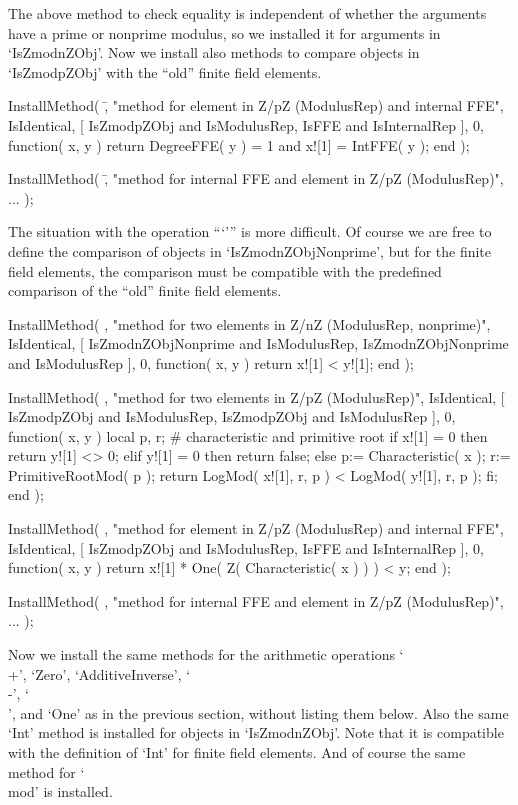 The above method to check equality is independent of whether the
arguments have a prime or nonprime modulus,
so we installed it for arguments in `IsZmodnZObj'.
Now we install also methods to compare objects in `IsZmodpZObj'
with the ``old'' finite field elements.

\beginexample
    InstallMethod( \=,
        "method for element in Z/pZ (ModulusRep) and internal FFE",
        IsIdentical,
        [ IsZmodpZObj and IsModulusRep, IsFFE and IsInternalRep ], 0,
        function( x, y )
        return DegreeFFE( y ) = 1 and x![1] = IntFFE( y );
        end );

    InstallMethod( \=,
        "method for internal FFE and element in Z/pZ (ModulusRep)",
        ... );
\endexample

The situation with the operation ```\<''' is more difficult.
Of course we are free to define the comparison of objects in
`IsZmodnZObjNonprime',
but for the finite field elements, the comparison must be compatible
with the predefined comparison of the ``old'' finite field elements.

\beginexample
    InstallMethod( \<,
        "method for two elements in Z/nZ (ModulusRep, nonprime)",
        IsIdentical,
        [ IsZmodnZObjNonprime and IsModulusRep,
          IsZmodnZObjNonprime and IsModulusRep ], 0,
        function( x, y ) return x![1] < y![1]; end );

    InstallMethod( \<,
        "method for two elements in Z/pZ (ModulusRep)",
        IsIdentical,
        [ IsZmodpZObj and IsModulusRep,
          IsZmodpZObj and IsModulusRep ], 0,
        function( x, y )
        local p, r;      # characteristic and primitive root
        if x![1] = 0 then
          return y![1] <> 0;
        elif y![1] = 0 then
          return false;
        else
          p:= Characteristic( x );
          r:= PrimitiveRootMod( p );
          return LogMod( x![1], r, p ) < LogMod( y![1], r, p );
        fi;
        end );

    InstallMethod( \<,
        "method for element in Z/pZ (ModulusRep) and internal FFE",
        IsIdentical,
        [ IsZmodpZObj and IsModulusRep, IsFFE and IsInternalRep ], 0,
        function( x, y )
        return x![1] * One( Z( Characteristic( x ) ) ) < y;
        end );

    InstallMethod( \<,
        "method for internal FFE and element in Z/pZ (ModulusRep)",
        ... );
\endexample

Now we install the same methods for the arithmetic operations
`\\+', `Zero', `AdditiveInverse', `\\-', `\\\*', and `One'
as in the previous section, without listing them below.
Also the same `Int' method is installed for objects in `IsZmodnZObj'.
Note that it is compatible with the definition of `Int' for finite
field elements.
And of course the same method for `\\mod' is installed.

